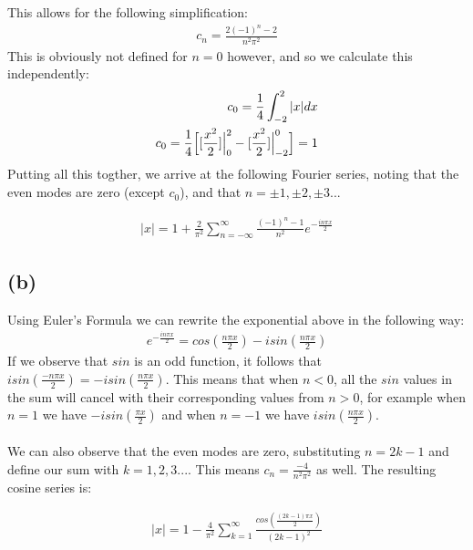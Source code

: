 \documentclass{article}
\begin{document}
This allows for the following simplification:
\begin{equation}
\begin{aligned}
c_n = \frac{2(-1)^n - 2}{n^2\pi^2}
\end{aligned}
\end{equation}
This is obviously not defined for $n=0$ however, and so we calculate this independently:
\begin{equation}
\begin{aligned}
c_0 = \frac{1}{4}\int_{-2}^2|x|dx\\
c_0 = \frac{1}{4} \Big{[}[\frac{x^2}{2}]\Big{|}_0^2 - [\frac{x^2}{2}]\Big{|}_{-2}^0 \Big{]} = 1
\end{aligned}
\end{equation}
Putting all this togther, we arrive at the following Fourier series, noting that the even modes are zero (except $c_0$), and that $n = \pm 1, \pm 2, \pm 3...$
\begin{tcolorbox}[minipage,colback=white,arc=0pt,outer arc=0pt]
\begin{equation}
\begin{aligned}
|x| = 1 + \frac{2}{\pi^2}\sum_{n=-\infty}^{\infty}\frac{(-1)^n - 1}{n^2}e^{-\frac{in\pi x}{2}}
\end{aligned}
\end{equation}
\end{tcolorbox}
\subsection*{\textbf{(b)}}
Using Euler's Formula we can rewrite the exponential above in the following way:
\begin{equation}
\begin{aligned}
e^{-\frac{in\pi x}{2}} = cos(\frac{n\pi x}{2}) - isin(\frac{n\pi x}{2})
\end{aligned}
\end{equation}
If we observe that $sin$ is an odd function, it follows that $isin(\frac{-n\pi x}{2}) = - isin(\frac{n\pi x}{2})$. This means that when $n<0$, all the $sin$ values in the sum will cancel with their corresponding values from $n>0$, for example when $n=1$ we have  $- isin(\frac{\pi x}{2})$ and when $n=-1$ we have   $isin(\frac{n\pi x}{2})$.\\
\\
We can also observe that the even modes are zero, substituting $n = 2k-1$ and define our sum with $k = 1, 2, 3...$. This means $c_n = \frac{-4}{n^2\pi^2}$ as well. The resulting cosine series is:
\begin{tcolorbox}[minipage,colback=white,arc=0pt,outer arc=0pt]
\begin{equation}
\begin{aligned}
|x| = 1 - \frac{4}{\pi^2}\sum_{k=1}^{\infty}\frac{cos(\frac{(2k-1)\pi x}{2})}{(2k-1)^2}
\end{aligned}
\end{equation}
\end{tcolorbox}
\end{document}
